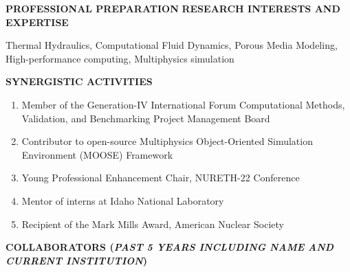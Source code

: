\documentclass[11pt,letterpaper,english]{article}
\begin{document}
\begin{flushleft} {\bf PROFESSIONAL PREPARATION}
\vspace{.15in}
{\bf RESEARCH INTERESTS AND EXPERTISE}
{\parindent 16pt

Thermal Hydraulics, Computational Fluid Dynamics, Porous Media Modeling, High-performance computing, Multiphysics simulation
}

\vspace{.15in}
{\bf SYNERGISTIC ACTIVITIES}
\vspace{-6pt}
\begin{enumerate} \itemsep1pt \parskip0pt 
\item Member of the Generation-IV International Forum Computational Methods, Validation, and Benchmarking Project Management Board \\ 
\item Contributor to open-source Multiphysics Object-Oriented Simulation Environment (MOOSE) Framework \\ 
\item Young Professional Enhancement Chair, NURETH-22 Conference \\ 
\item Mentor of interns at Idaho National Laboratory \\ 
\item Recipient of the Mark Mills Award, American Nuclear Society \\ 
\end{enumerate} 

\vspace{.15in}
{\bf COLLABORATORS ({\emph{PAST 5 YEARS INCLUDING NAME AND CURRENT INSTITUTION}})} 
{\parindent 16pt


}
\end{flushleft}
\end{document}
